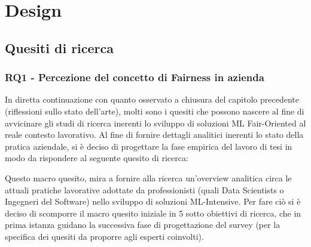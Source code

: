 \chapter{Design} %
%
    \section{Quesiti di ricerca}
    \subsection{RQ1 - Percezione del concetto di Fairness in azienda}
    
    In diretta continuazione con quanto osservato a chiusura del capitolo precedente (riflessioni sullo stato dell'arte), molti sono i quesiti che possono nascere al fine di avvicinare gli studi di ricerca inerenti lo sviluppo di soluzioni ML Fair-Oriented al reale contesto lavorativo. Al fine di fornire dettagli analitici inerenti lo stato della pratica aziendale, si è deciso di progettare la fase empirica del lavoro di tesi in modo da rispondere al seguente quesito di ricerca:
    
    \begin{center}
		\hspace*{-5mm}%
	\end{center}
	
	Questo macro quesito, mira a fornire alla ricerca un'overview analitica circa le attuali pratiche lavorative adottate da professionisti (quali Data Scientists o Ingegneri del Software) nello sviluppo di soluzioni ML-Intensive. Per fare ciò si è deciso di scomporre il macro quesito iniziale in 5 sotto obiettivi di ricerca, che in prima istanza guidano la successiva fase di progettazione del survey (per la specifica dei quesiti da proporre agli esperti coinvolti).\\
	

